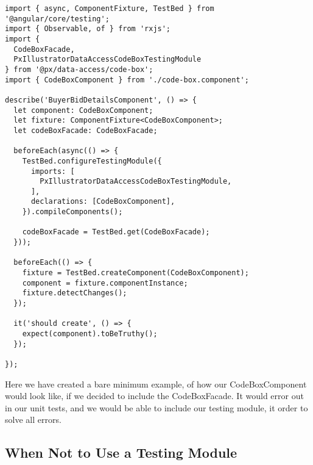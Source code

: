 \begin{lstlisting}
import { async, ComponentFixture, TestBed } from '@angular/core/testing';
import { Observable, of } from 'rxjs';
import {
  CodeBoxFacade,
  PxIllustratorDataAccessCodeBoxTestingModule
} from '@px/data-access/code-box';
import { CodeBoxComponent } from './code-box.component';

describe('BuyerBidDetailsComponent', () => {
  let component: CodeBoxComponent;
  let fixture: ComponentFixture<CodeBoxComponent>;
  let codeBoxFacade: CodeBoxFacade;

  beforeEach(async(() => {
    TestBed.configureTestingModule({
      imports: [
        PxIllustratorDataAccessCodeBoxTestingModule,
      ],
      declarations: [CodeBoxComponent],
    }).compileComponents();

    codeBoxFacade = TestBed.get(CodeBoxFacade);
  }));

  beforeEach(() => {
    fixture = TestBed.createComponent(CodeBoxComponent);
    component = fixture.componentInstance;
    fixture.detectChanges();
  });

  it('should create', () => {
    expect(component).toBeTruthy();
  });

});

\end{lstlisting}

Here we have created a bare minimum example, of how our CodeBoxComponent would
look like, if we decided to include the CodeBoxFacade. It would error out in
our unit tests, and we would be able to include our testing module, it order to
solve all errors.

\subsection{ When Not to Use a Testing Module }
